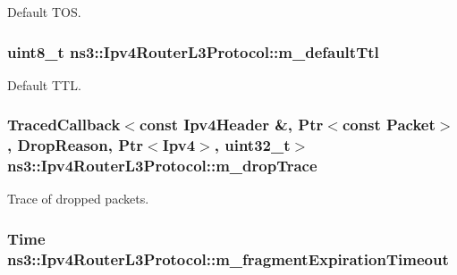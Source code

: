 Default T\-O\-S. 

\hypertarget{classns3_1_1Ipv4RouterL3Protocol_adb12b01444eefa31adaf30ed6397cc52}{
\subsubsection[{m\-\_\-default\-Ttl}]{\setlength{\rightskip}{0pt plus 5cm}uint8\-\_\-t ns3\-::\-Ipv4\-Router\-L3\-Protocol\-::m\-\_\-default\-Ttl\hspace{0.3cm}{\ttfamily [private]}}}\label{classns3_1_1Ipv4RouterL3Protocol_adb12b01444eefa31adaf30ed6397cc52}


Default T\-T\-L. 

\hypertarget{classns3_1_1Ipv4RouterL3Protocol_ab598d069af6668c2d60e77965463f75e}{
\subsubsection[{m\-\_\-drop\-Trace}]{\setlength{\rightskip}{0pt plus 5cm}Traced\-Callback$<$const Ipv4\-Header \&, Ptr$<$const Packet$>$, {\bf Drop\-Reason}, Ptr$<$Ipv4$>$, uint32\-\_\-t$>$ ns3\-::\-Ipv4\-Router\-L3\-Protocol\-::m\-\_\-drop\-Trace\hspace{0.3cm}{\ttfamily [private]}}}\label{classns3_1_1Ipv4RouterL3Protocol_ab598d069af6668c2d60e77965463f75e}


Trace of dropped packets. 

\hypertarget{classns3_1_1Ipv4RouterL3Protocol_ab643fecf4d7c8882c84ae9a028de4a43}{
\subsubsection[{m\-\_\-fragment\-Expiration\-Timeout}]{\setlength{\rightskip}{0pt plus 5cm}Time ns3\-::\-Ipv4\-Router\-L3\-Protocol\-::m\-\_\-fragment\-Expiration\-Timeout\hspace{0.3cm}{\ttfamily [private]}}}\label{classns3_1_1Ipv4RouterL3Protocol_ab643fecf4d7c8882c84ae9a028de4a43}



